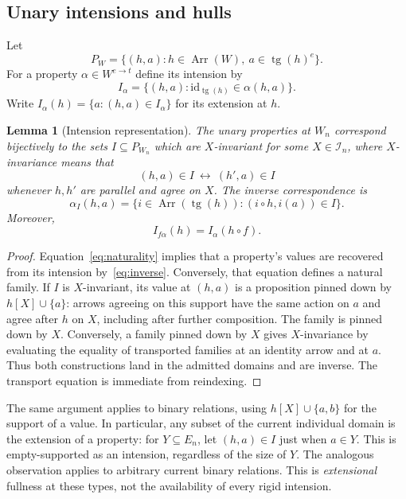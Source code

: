 \documentclass[11pt]{article}
\newtheorem{lemma}[theorem]{Lemma}
\theoremstyle{definition}
\newcommand{\Arr}{\operatorname{Arr}}
\newcommand{\tg}{\operatorname{tg}}
\newcommand{\id}{\mathrm{id}}
\numberwithin{equation}{section}
\begin{document}
\subsection{Unary intensions and hulls}

Let
$$
P_W=\{(h,a):h\in\Arr(W),\ a\in\tg(h)^e\}.
$$
For a property $\alpha\in W^{e\to t}$ define its intension by
$$
I_\alpha=\{(h,a):\id_{\tg(h)}\in\alpha(h,a)\}.
$$
Write $I_\alpha(h)=\{a:(h,a)\in I_\alpha\}$ for its extension at $h$.

\begin{lemma}[Intension representation]\label{lem:intensions}
The unary properties at $W_n$ correspond bijectively to the sets $I\subseteq P_{W_n}$ which are $X$-invariant for some $X\in\mathcal I_n$, where $X$-invariance means that
$$
(h,a)\in I\ \leftrightarrow\ (h',a)\in I
$$
whenever $h,h'$ are parallel and agree on $X$. The inverse correspondence is
\begin{equation}\label{eq:inverse}
\alpha_I(h,a)=\{i\in\Arr(\tg(h)):(i\circ h,i(a))\in I\}.
\end{equation}
Moreover,
\begin{equation}\label{eq:transportI}
I_{f\alpha}(h)=I_\alpha(h\circ f).
\end{equation}
\end{lemma}
\begin{proof}
Equation~\eqref{eq:naturality} implies that a property's values are recovered from its intension by~\eqref{eq:inverse}. Conversely, that equation defines a natural family. If $I$ is $X$-invariant, its value at $(h,a)$ is a proposition pinned down by $h[X]\cup\{a\}$: arrows agreeing on this support have the same action on $a$ and agree after $h$ on $X$, including after further composition. The family is pinned down by $X$. Conversely, a family pinned down by $X$ gives $X$-invariance by evaluating the equality of transported families at an identity arrow and at $a$. Thus both constructions land in the admitted domains and are inverse. The transport equation is immediate from reindexing.
\end{proof}

The same argument applies to binary relations, using $h[X]\cup\{a,b\}$ for the support of a value. In particular, any subset of the current individual domain is the extension of a property: for $Y\subseteq E_n$, let $(h,a)\in I$ just when $a\in Y$. This is empty-supported as an intension, regardless of the size of $Y$. The analogous observation applies to arbitrary current binary relations. This is \emph{extensional} fullness at these types, not the availability of every rigid intension.
\end{document}
